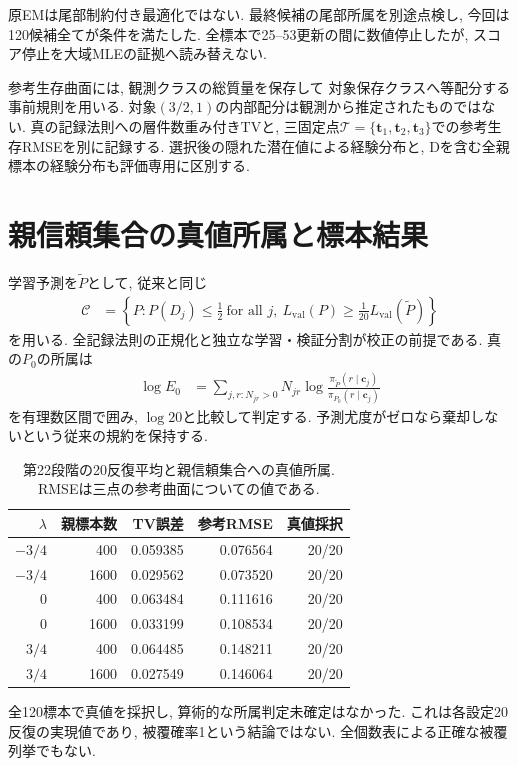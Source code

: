 原EMは尾部制約付き最適化ではない.
最終候補の尾部所属を別途点検し, 今回は120候補全てが条件を満たした.
全標本で25--53更新の間に数値停止したが,
スコア停止を大域MLEの証拠へ読み替えない.

参考生存曲面には, 観測クラスの総質量を保存して
対象保存クラスへ等配分する事前規則を用いる.
対象$(3/2,1)$の内部配分は観測から推定されたものではない.
真の記録法則への層件数重み付きTVと,
三固定点$\mathcal T=\{\bm t_1,\bm t_2,\bm t_3\}$での参考生存RMSEを別に記録する.
選択後の隠れた潜在値による経験分布と,
Dを含む全親標本の経験分布も評価専用に区別する.

\section{親信頼集合の真値所属と標本結果}
\label{sec:stage22_coverage}

学習予測を$\widetilde P$として, 従来と同じ
\begin{align}
\mathcal C
&=\left\{P:P(D_j)\le\frac12\ \text{for all }j,
\ L_{\mathrm{val}}(P)\ge
\frac1{20}L_{\mathrm{val}}(\widetilde P)\right\}
\label{eq:stage22_confidence_set}
\end{align}
を用いる. 全記録法則の正規化と独立な学習・検証分割が校正の前提である.
真の$P_0$の所属は
\begin{align}
\log E_0
&=\sum_{j,r:N_{jr}>0}N_{jr}
\log\frac{\pi_{\widetilde P}(r\mid\bm c_j)}
{\pi_{P_0}(r\mid\bm c_j)}
\label{eq:stage22_true_membership}
\end{align}
を有理数区間で囲み, $\log20$と比較して判定する.
予測尤度がゼロなら棄却しないという従来の規約を保持する.

\begin{table}[htbp]
\centering
\caption{第22段階の20反復平均と親信頼集合への真値所属.
RMSEは三点の参考曲面についての値である.}
\label{tab:stage22_sampling}
\begin{tabular}{rrrrr}
\toprule
$\lambda$ & 親標本数 & TV誤差 & 参考RMSE & 真値採択 \\
\midrule
$-3/4$ & 400  & 0.059385 & 0.076564 & 20/20 \\
$-3/4$ & 1600 & 0.029562 & 0.073520 & 20/20 \\
$0$    & 400  & 0.063484 & 0.111616 & 20/20 \\
$0$    & 1600 & 0.033199 & 0.108534 & 20/20 \\
$3/4$  & 400  & 0.064485 & 0.148211 & 20/20 \\
$3/4$  & 1600 & 0.027549 & 0.146064 & 20/20 \\
\bottomrule
\end{tabular}
\end{table}
全120標本で真値を採択し, 算術的な所属判定未確定はなかった.
これは各設定20反復の実現値であり, 被覆確率1という結論ではない.
全個数表による正確な被覆列挙でもない.


